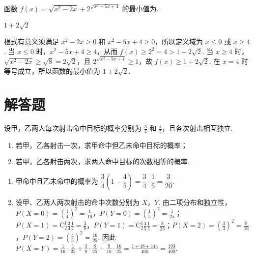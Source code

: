 \begin{problem}
函数 \( f(x)=\sqrt{x^{2}-2x}+2^{\sqrt{x^{2}-5x+4}} \) 的最小值为\fillinblank{}.
\end{problem}

\begin{answer}
\(1+2\sqrt{2}\)
\end{answer}

\begin{solution}
根式有意义须满足 \(x^2-2x\geqslant0\) 和 \(x^2-5x+4\geqslant0\)，所以定义域为 \(x\leqslant0\) 或 \(x\geqslant4\). 当 \(x\leqslant0\) 时，\(x^2-5x+4\geqslant4\)，从而 \(f(x)\geqslant2^2=4>1+2\sqrt2\). 当 \(x\geqslant4\) 时，\(\sqrt{x^2-2x}\geqslant\sqrt8=2\sqrt2\)，且 \(2^{\sqrt{x^2-5x+4}}\geqslant1\)，故 \(f(x)\geqslant1+2\sqrt2\). 在 \(x=4\) 时等号成立，所以函数的最小值为 \(1+2\sqrt2\).
\end{solution}

\section{解答题}

\begin{problem}
设甲，乙两人每次射击命中目标的概率分别为 \(\frac{3}{4}\) 和 \(\frac{4}{5}\)，且各次射击相互独立.

\begin{enumerate}
\item 若甲，乙各射击一次，求甲命中但乙未命中目标的概率；
\item 若甲，乙各射击两次，求两人命中目标的次数相等的概率.
\end{enumerate}
\end{problem}

\begin{solution}
\begin{enumerate}
\item 甲命中且乙未命中的概率为 \(\dfrac34\left(1-\dfrac45\right)=\dfrac34\cdot\dfrac15=\dfrac{3}{20}\).
\item 设甲、乙两人两次射击的命中次数分别为 \(X\)，\(Y\). 由二项分布和独立性，\(P(X=0)=\left(\frac14\right)^2=\frac1{16}\)，\(P(Y=0)=\left(\frac15\right)^2=\frac1{25}\)；\(P(X=1)=\mathrm C_2^1\frac34\frac14=\frac38\)，\(P(Y=1)=\mathrm C_2^1\frac45\frac15=\frac8{25}\)；\(P(X=2)=\left(\frac34\right)^2=\frac9{16}\)，\(P(Y=2)=\left(\frac45\right)^2=\frac{16}{25}\). 因此 \(P(X=Y)=\frac1{16}\cdot\frac1{25}+\frac38\cdot\frac8{25}+\frac9{16}\cdot\frac{16}{25}=\frac{1+48+144}{400}=\frac{193}{400}\).
\end{enumerate}
\end{solution}

